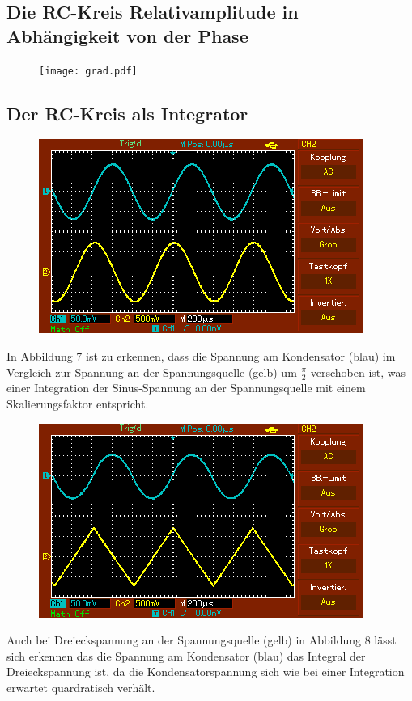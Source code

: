 	 \subsection{Die RC-Kreis Relativamplitude in Abhängigkeit von der Phase}

	 \begin{figure}[H]
	  \centering
	  \caption{}
	  \texttt{[image: grad.pdf]}
	  \label{fig:grab}
	 \end{figure}
	 
	 
	 \subsection{Der RC-Kreis als Integrator}
	 \begin{figure}[H]
	 	\centering
	 	\caption{}
	 	\includegraphics[width=\linewidth-70pt,height=\textheight-70pt,keepaspectratio]{content/MAP002.png}
	 	\label{fig:Sinus}
	 \end{figure}
	 In Abbildung 7 ist zu erkennen, dass die Spannung am Kondensator (blau) im Vergleich zur Spannung an der Spannungsquelle (gelb) um $\frac{\pi}{2}$ verschoben ist, was einer Integration der Sinus-Spannung an der Spannungsquelle mit einem Skalierungsfaktor entspricht. 
	 
	 
	 \begin{figure}[H]
	 	\centering
	 	\caption{}
	 	\includegraphics[width=\linewidth-70pt,height=\textheight-70pt,keepaspectratio]{content/MAP003.png}
	 	\label{fig:Dreieck}
	 \end{figure}
	 Auch bei Dreieckspannung an der Spannungsquelle (gelb) in Abbildung 8 lässt sich erkennen das die Spannung am Kondensator (blau) das Integral der Dreieckspannung ist, da die Kondensatorspannung sich wie bei einer Integration erwartet quardratisch verhält.
	 
